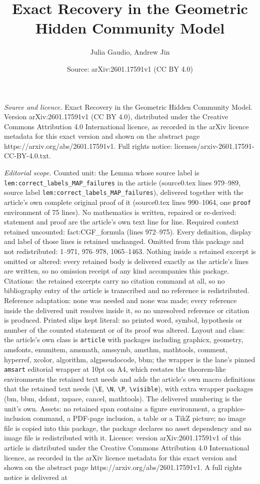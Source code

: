 \documentclass[10pt,a4paper]{amsart}
\title[Exact Recovery in the Geometric Hidden Community Model]{Exact Recovery in the Geometric Hidden Community Model}
\author{Julia Gaudio, Andrew Jin}
\date{Source: arXiv:2601.17591v1 (CC BY 4.0)}
\begin{document}
\maketitle

\noindent\emph{Source and licence.} Exact Recovery in the Geometric Hidden Community Model. Version arXiv:2601.17591v1 (CC BY 4.0), distributed under the Creative Commons Attribution 4.0 International licence, as recorded in the arXiv licence metadata for this exact version and shown on the abstract page https://arxiv.org/abs/2601.17591v1. Full rights notice: licenses/arxiv-2601.17591-CC-BY-4.0.txt.\par\smallskip

\noindent\textit{Editorial scope.} Counted unit: the Lemma whose source label is \texttt{lem:correct\_labels\_MAP\_failures} in the article (source0.tex lines 979--989, source label \texttt{lem:correct\_labels\_MAP\_failures}), delivered together with the article's own complete original proof of it (source0.tex lines 990--1064, one \texttt{proof} environment of 75 lines). No mathematics is written, repaired or re-derived: statement and proof are the article's own text line for line. Required context retained uncounted: fact:CGF\_formula (lines 972--975). Every definition, display and label of those lines is retained unchanged. Omitted from this package and not redistributed: 1--971, 976--978, 1065--1463. Nothing inside a retained excerpt is omitted or altered: every retained body is delivered exactly as the article's lines are written, so no omission receipt of any kind accompanies this package. Citations: the retained excerpts carry no citation command at all, so no bibliography entry of the article is transcribed and no reference is redistributed. Reference adaptation: none was needed and none was made; every reference inside the delivered unit resolves inside it, so no unresolved reference or citation is produced. Printed slips kept literal: no printed word, symbol, hypothesis or number of the counted statement or of its proof was altered. Layout and class: the article's own class is \texttt{article} with packages including graphicx, geometry, amsfonts, enumitem, amsmath, amssymb, amsthm, mathtools, comment, hyperref, xcolor, algorithm, algpseudocode, bbm; the wrapper is the lane's pinned \texttt{amsart} editorial wrapper at 10pt on A4, which restates the theorem-like environments the retained text needs and adds the article's own macro definitions that the retained text needs (\texttt{\textbackslash E}, \texttt{\textbackslash N}, \texttt{\textbackslash P}, \texttt{\textbackslash visible}), with extra wrapper packages (bm, bbm, dsfont, xspace, cancel, mathtools). The delivered numbering is the unit's own. Assets: no retained span contains a figure environment, a graphics-inclusion command, a PDF-page inclusion, a table or a TikZ picture; no image file is copied into this package, the package declares no asset dependency and no image file is redistributed with it. Licence: version arXiv:2601.17591v1 of this article is distributed under the Creative Commons Attribution 4.0 International licence, as recorded in the arXiv licence metadata for this exact version and shown on the abstract page https://arxiv.org/abs/2601.17591v1. A full rights notice is delivered at 
\end{document}
